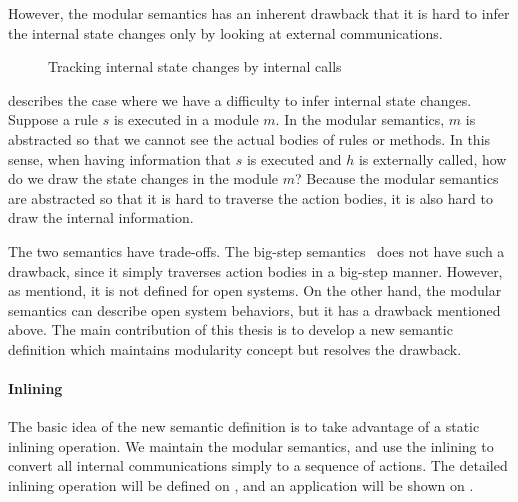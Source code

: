 However, the modular semantics has an inherent drawback that it is
hard to infer the internal state changes only by looking at external
communications.
\begin{figure}[t]
  \caption{Tracking internal state changes by internal calls}
  \label{ex-modular-semantics-disadvantage}
\end{figure}
 describes the case where we
have a difficulty to infer internal state changes. Suppose a rule $s$
is executed in a module $m$. In the modular semantics, $m$ is
abstracted so that we cannot see the actual bodies of rules or
methods. In this sense, when having information that $s$ is executed
and $h$ is externally called, how do we draw the state changes in the
module $m$? Because the modular semantics are abstracted so that it is
hard to traverse the action bodies, it is also hard to draw the
internal information.

The two semantics have trade-offs. The big-step
semantics~\cite{nirav-memocode} does not have such a drawback, since
it simply traverses action bodies in a big-step manner. However, as
mentiond, it is not defined for open systems. On the other hand, the
modular semantics can describe open system behaviors, but it has a
drawback mentioned above. The main contribution of this thesis is to
develop a new semantic definition which maintains modularity concept
but resolves the drawback.

\paragraph{Inlining}

The basic idea of the new semantic definition is to take advantage of
a static inlining operation. We maintain the modular semantics, and
use the inlining to convert all internal communications simply to a
sequence of actions. The detailed inlining operation will be defined
on , and an application will be shown
on .

